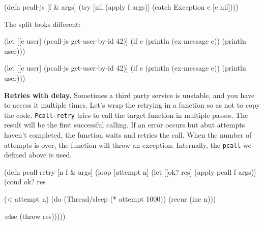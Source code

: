 \begin{english}
  \begin{clojure}
(defn pcall-js [f & args]
  (try
    [nil (apply f args)]
    (catch Exception e [e nil])))
  \end{clojure}
\end{english}

\noindent
The split looks different:

\ifx\DEVICETYPE\MOBILE

\begin{english}
  \begin{clojure}
(let [[e user]
      (pcall-js get-user-by-id 42)]
  (if e
    (println (ex-message e))
    (println user)))
  \end{clojure}
\end{english}

\else

\begin{english}
  \begin{clojure}
(let [[e user] (pcall-js get-user-by-id 42)]
  (if e
    (println (ex-message e))
    (println user)))
  \end{clojure}
\end{english}

\fi


\textbf{ Retries with delay.} Sometimes a third party service is unstable, and you have to access it multiple times. Let's wrap the retrying in a function so as not to copy the code. \verb|Pcall-retry| tries to call the target function in multiple passes. The result will be the first successful calling. If an error occurs but abut attempts haven't completed, the function waits and retries the call. When the number of attempts is over, the function will throw an exception.
Internally, the \verb|pcall| we defined above is used.


\ifx\DEVICETYPE\MOBILE

\begin{english}
  \begin{clojure}
(defn pcall-retry [n f & args]
  (loop [attempt n]
    (let [[ok? res] (apply pcall f args)]
      (cond
        ok? res

        (< attempt n)
        (do (Thread/sleep
              (* attempt 1000))
            (recur (inc n)))

        :else (throw res)))))
  \end{clojure}
\end{english}

